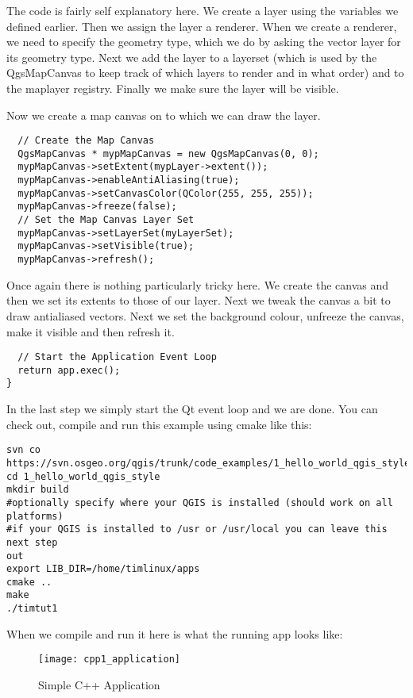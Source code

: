 The code is fairly self explanatory here. We create a layer using the
variables we defined earlier. Then we assign the layer a renderer. 
When we create a renderer, we need to specify the geometry type, which 
we do by asking the vector layer for its geometry type. Next we add 
the layer to a layerset (which is used by the QgsMapCanvas to keep 
track of which layers to render and in what order) and to the maplayer 
registry. Finally we make sure the layer will be visible.

Now we create a map canvas on to which we can draw the layer.

\begin{verbatim}
  // Create the Map Canvas
  QgsMapCanvas * mypMapCanvas = new QgsMapCanvas(0, 0);
  mypMapCanvas->setExtent(mypLayer->extent());
  mypMapCanvas->enableAntiAliasing(true);
  mypMapCanvas->setCanvasColor(QColor(255, 255, 255));
  mypMapCanvas->freeze(false);
  // Set the Map Canvas Layer Set
  mypMapCanvas->setLayerSet(myLayerSet);
  mypMapCanvas->setVisible(true);
  mypMapCanvas->refresh();

\end{verbatim}

Once again there is nothing particularly tricky here. We create the canvas
and then we set its extents to those of our layer. Next we tweak the canvas a bit
to draw antialiased vectors. Next we set the background colour, unfreeze the
canvas, make it visible and then refresh it.

\begin{verbatim}
  // Start the Application Event Loop
  return app.exec();
}

\end{verbatim}

In the last step we simply start the Qt event loop and we are done. You
can check out, compile and run this example using cmake like this:

\begin{verbatim}
svn co
https://svn.osgeo.org/qgis/trunk/code_examples/1_hello_world_qgis_style
cd 1_hello_world_qgis_style
mkdir build
#optionally specify where your QGIS is installed (should work on all
platforms)
#if your QGIS is installed to /usr or /usr/local you can leave this next step
out
export LIB_DIR=/home/timlinux/apps
cmake ..
make
./timtut1
\end{verbatim}

When we compile and run it here is what the running app looks like:

\begin{figure}[ht]
   \begin{center}
   \caption{Simple C++ Application \osxcaption}\label{fig:cpp1_application}\smallskip
   \texttt{[image: cpp1\_application]}
\end{center}
\end{figure}

